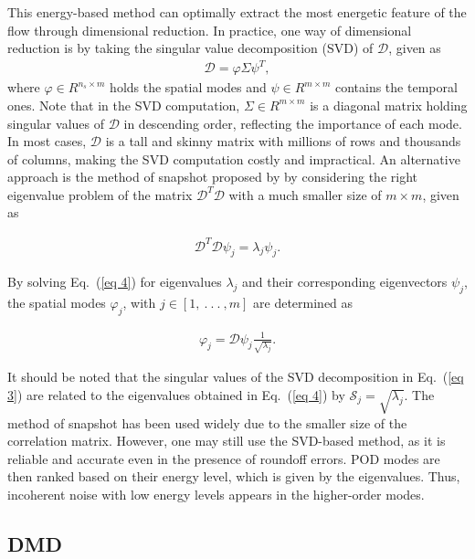 \documentclass[a4paper,fleqn]{cas-sc}
\begin{document}
	This energy-based method can optimally extract the most energetic feature of the flow through dimensional reduction. In practice, one way of dimensional reduction is by taking the singular value decomposition (SVD) of $\mathcal{D}$, given as
	\begin{align}
		\mathcal{D} = \varphi \Sigma \psi^T ,\label{eq 3}
	\end{align}
	\noindent where $\varphi \in R^{n_s\times m}$ holds the spatial modes and $\psi\in R^{m\times m}$ contains the temporal ones. Note that in the SVD computation, $\Sigma\in R^{m\times m}$ is a diagonal matrix holding singular values of $\mathcal{D}$ in descending order, reflecting the importance of each mode. In most cases, $\mathcal{D}$ is a tall and skinny matrix with millions of rows and thousands of columns, making the SVD computation costly and impractical. An alternative approach is the method of snapshot proposed by \citet{Sirovich1987} by considering the right eigenvalue problem of the matrix $\mathcal{D}^T\mathcal{D}$ with a much smaller size of $m\times m$, given as 
	
	\begin{align}
		\mathcal{D}^T\mathcal{D}\psi _j = \lambda _j \psi _j.\label{eq 4}
	\end{align}
	
	\noindent By solving Eq.~(\ref{eq 4}) for eigenvalues $\lambda _j$ and their corresponding eigenvectors $\psi _j$, the spatial modes $\varphi _j$, with $j\in [1,~.~.~.~, m]$ are determined as
	
	\begin{align}
		\varphi _j = \mathcal{D} \psi _j \frac{1}{\sqrt{\lambda _j}}.\label{eq 5}
	\end{align}
	
	\noindent It should be noted that the singular values of the SVD decomposition in Eq.~(\ref{eq 3}) are related to the eigenvalues obtained in Eq.~(\ref{eq 4}) by $\mathcal{S}_j = \sqrt{\lambda_j}$. The method of snapshot has been used widely due to the smaller size of the correlation matrix. However, one may still use the SVD-based method, as it is reliable and accurate even in the presence of roundoff errors. POD modes are then ranked based on their energy level, which is given by the eigenvalues. Thus, incoherent noise with low energy levels appears in the higher-order modes.
	
	
	\subsection{DMD}
	\label{DMD}
	
\end{document}
